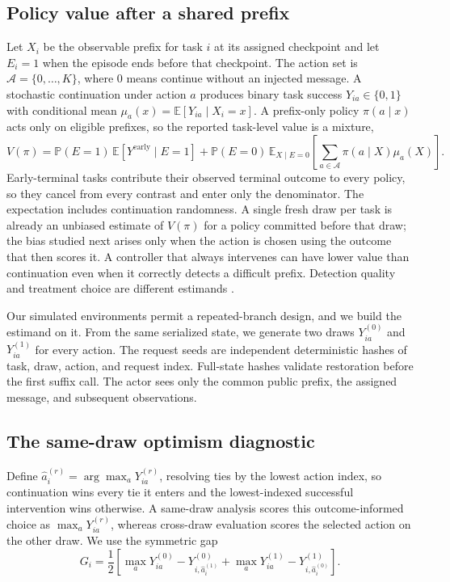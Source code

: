 \subsection{Policy value after a shared prefix}

Let $X_i$ be the observable prefix for task $i$ at its assigned checkpoint and let $E_i=1$ when the episode ends before that checkpoint. The action set is $\mathcal{A}=\{0,\ldots,K\}$, where $0$ means continue without an injected message. A stochastic continuation under action $a$ produces binary task success $Y_{ia}\in\{0,1\}$ with conditional mean $\mu_a(x)=\mathbb{E}[Y_{ia}\mid X_i=x]$. A prefix-only policy $\pi(a\mid x)$ acts only on eligible prefixes, so the reported task-level value is a mixture,
\begin{equation}
V(\pi)=\mathbb{P}(E=1)\,\mathbb{E}\!\left[Y^{\mathrm{early}}\mid E=1\right]
+\mathbb{P}(E=0)\,\mathbb{E}_{X\mid E=0}\!\left[\sum_{a\in\mathcal{A}}\pi(a\mid X)\mu_a(X)\right].
\label{eq:policy-value}
\end{equation}
Early-terminal tasks contribute their observed terminal outcome to every policy, so they cancel from every contrast and enter only the denominator. The expectation includes continuation randomness. A single fresh draw per task is already an unbiased estimate of $V(\pi)$ for a policy committed before that draw; the bias studied next arises only when the action is chosen using the outcome that then scores it. A controller that always intervenes can have lower value than continuation even when it correctly detects a difficult prefix. Detection quality and treatment choice are different estimands \citep{vasudev2026failure}.

Our simulated environments permit a repeated-branch design, and we build the estimand on it. From the same serialized state, we generate two draws $Y_{ia}^{(0)}$ and $Y_{ia}^{(1)}$ for every action. The request seeds are independent deterministic hashes of task, draw, action, and request index. Full-state hashes validate restoration before the first suffix call. The actor sees only the common public prefix, the assigned message, and subsequent observations.

\subsection{The same-draw optimism diagnostic}

Define $\widehat a_i^{(r)}=\arg\max_a Y_{ia}^{(r)}$, resolving ties by the lowest action index, so continuation wins every tie it enters and the lowest-indexed successful intervention wins otherwise. A same-draw analysis scores this outcome-informed choice as $\max_aY_{ia}^{(r)}$, whereas cross-draw evaluation scores the selected action on the other draw. We use the symmetric gap
\begin{equation}
G_i=\frac{1}{2}\!\left[
\max_aY_{ia}^{(0)}-Y_{i,\widehat a_i^{(1)}}^{(0)}+
\max_aY_{ia}^{(1)}-Y_{i,\widehat a_i^{(0)}}^{(1)}
\right].
\label{eq:gap}
\end{equation}


